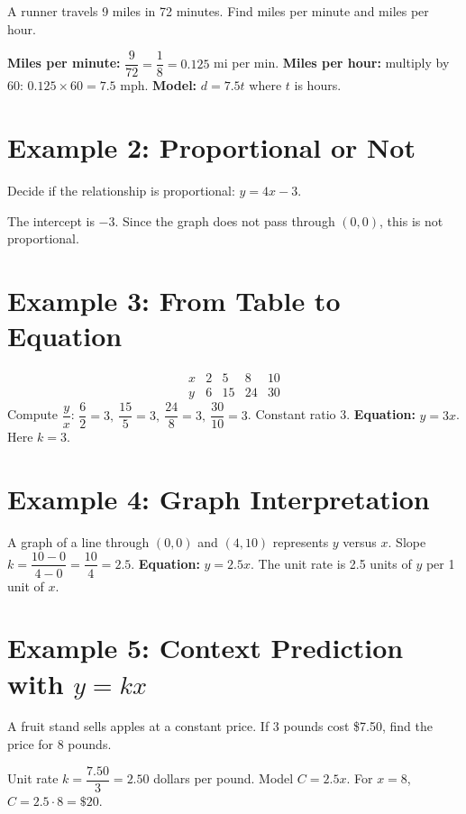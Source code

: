 \documentclass[14pt]{extarticle}
\begin{document}
A runner travels 9 miles in 72 minutes. Find miles per minute and miles per hour.

\textbf{Miles per minute:} \(\dfrac{9}{72} = \dfrac{1}{8} = 0.125\) mi per min.  
\textbf{Miles per hour:} multiply by 60: \(0.125 \times 60 = 7.5\) mph.  
\textbf{Model:} \(d = 7.5t\) where \(t\) is hours.

\section*{Example 2: Proportional or Not}

Decide if the relationship is proportional: \(y = 4x - 3\).

The intercept is \(-3\). Since the graph does not pass through \((0,0)\), this is not proportional.

\section*{Example 3: From Table to Equation}

\[
\begin{array}{c|cccc}
x & 2 & 5 & 8 & 10\\ \hline
y & 6 & 15 & 24 & 30
\end{array}
\]
Compute \(\dfrac{y}{x}\): \(\dfrac{6}{2}=3,\ \dfrac{15}{5}=3,\ \dfrac{24}{8}=3,\ \dfrac{30}{10}=3\). Constant ratio 3.  
\textbf{Equation:} \(y = 3x\). Here \(k=3\).

\section*{Example 4: Graph Interpretation}

A graph of a line through \((0,0)\) and \((4,10)\) represents \(y\) versus \(x\).  
Slope \(k = \dfrac{10-0}{4-0} = \dfrac{10}{4} = 2.5\).  
\textbf{Equation:} \(y = 2.5x\). The unit rate is 2.5 units of \(y\) per 1 unit of \(x\).

\section*{Example 5: Context Prediction with \(y = kx\)}

A fruit stand sells apples at a constant price. If 3 pounds cost \$7.50, find the price for 8 pounds.

Unit rate \(k = \dfrac{7.50}{3} = 2.50\) dollars per pound.  
Model \(C = 2.5x\). For \(x=8\), \(C = 2.5 \cdot 8 = \$20\).
\end{document}
